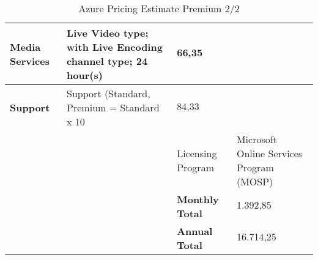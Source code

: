 \begin{landscape}
\begin{table}[]
\begin{tabularx}{\linewidth}{|l||l|l|}
\textbf{Media Services}                                                    & Live Video type; with Live Encoding channel type; 24 hour(s)                                                                                                                                                                                   & 66,35                                   \\ \hline
\textbf{Support}                                                           & Support (Standard,  Premium = Standard x 10                                                                                                                                                                                                    & 84,33                                   \\ \hline
                                  &                                         & Licensing Program                                                                                                                                                                                                                              & Microsoft Online Services Program (MOSP) \\ \hline
                                  &                                         & \textbf{Monthly Total}                                                                                                                                                                                                                         & 1.392,85                                \\ \hline
                                  &                                         & \textbf{Annual Total}                                                                                                                                                                                                                          & 16.714,25                              
\end{tabularx}
\caption{Azure Pricing Estimate Premium 2/2}
\label{tab:azPriceT1_2}
\end{table}
\end{landscape}
